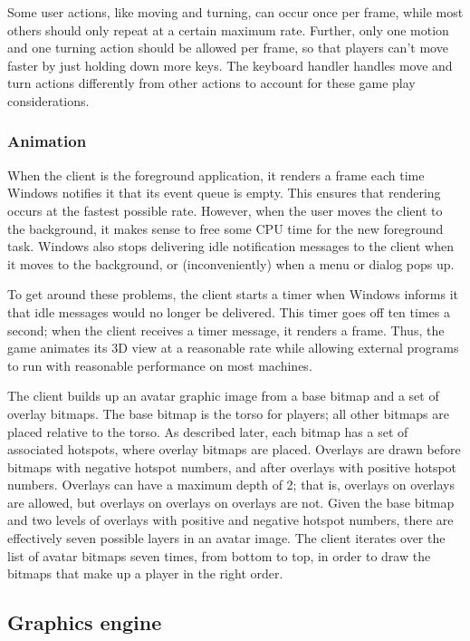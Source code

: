 Some user actions, like moving and turning, can occur once per frame,
while most others should only repeat at a certain maximum rate.
Further, only one motion and one turning action should be allowed per
frame, so that players can't move faster by just holding down more
keys.  The keyboard handler handles move and turn actions differently
from other actions to account for these game play considerations.


\subsubsection{Animation}

When the client is the foreground application, it renders a frame each
time Windows notifies it that its event queue is empty.  This ensures
that rendering occurs at the fastest possible rate.  However, when the
user moves the client to the background, it makes sense to free some
CPU time for the new foreground task.  Windows also stops delivering
idle notification messages to the client when it moves to the
background, or (inconveniently) when a menu or dialog pops up.

To get around these problems, the client starts a timer when Windows
informs it that idle messages would no longer be delivered.  This
timer goes off ten times a second; when the client receives a timer
message, it renders a frame.  Thus, the game animates its 3D view at a
reasonable rate while allowing external programs to run with
reasonable performance on most machines.

The client builds up an avatar graphic image from a base bitmap and a
set of overlay bitmaps.  The base bitmap is the torso for players; all
other bitmaps are placed relative to the torso.  As described later,
each bitmap has a set of associated hotspots, where overlay bitmaps
are placed.  Overlays are drawn before bitmaps with negative hotspot
numbers, and after overlays with positive hotspot numbers.  Overlays
can have a maximum depth of 2; that is, overlays on overlays are
allowed, but overlays on overlays on overlays are not.  Given the base
bitmap and two levels of overlays with positive and negative hotspot
numbers, there are effectively seven possible layers in an avatar
image.  The client iterates over the list of avatar bitmaps seven
times, from bottom to top, in order to draw the bitmaps that make up a
player in the right order.

\subsection{Graphics engine}

